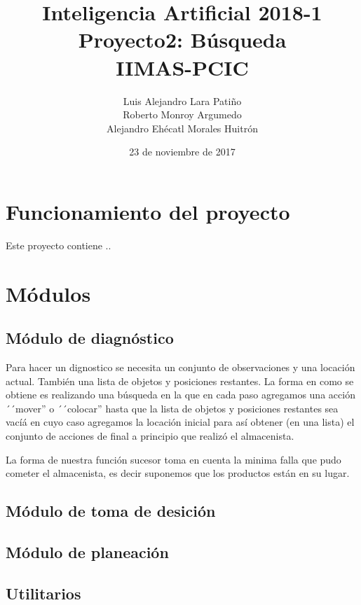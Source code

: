 \documentclass[11pt]{article}
\title{Inteligencia Artificial 2018-1 \\ Proyecto2: Búsqueda\\
\vspace{2mm}
\small{IIMAS-PCIC}}
\author{Luis Alejandro Lara Patiño\\Roberto Monroy Argumedo\\
Alejandro Ehécatl Morales Huitrón}
\date{23 de noviembre de 2017}
\begin{document}
\maketitle

\tableofcontents

\section{Funcionamiento del proyecto}

Este proyecto contiene ..

\section{Módulos}

\subsection{Módulo de diagnóstico}

Para hacer un dignostico se necesita un conjunto de observaciones y una
locación actual. También una lista de objetos y posiciones restantes.
La forma en como se obtiene es realizando una búsqueda en la que en cada
paso agregamos una acción ´´mover'' o ´´colocar'' hasta que la lista de
objetos y posiciones restantes sea vacíá en cuyo caso agregamos la
locación inicial para así obtener (en una lista) el conjunto de acciones
de final a principio que realizó el almacenista.

La forma de nuestra función sucesor toma en cuenta la minima falla que pudo
cometer el almacenista, es decir suponemos que los productos están en su
lugar.

\subsection{Módulo de toma de desición}

\subsection{Módulo de planeación}


\subsection{Utilitarios}
\end{document}

